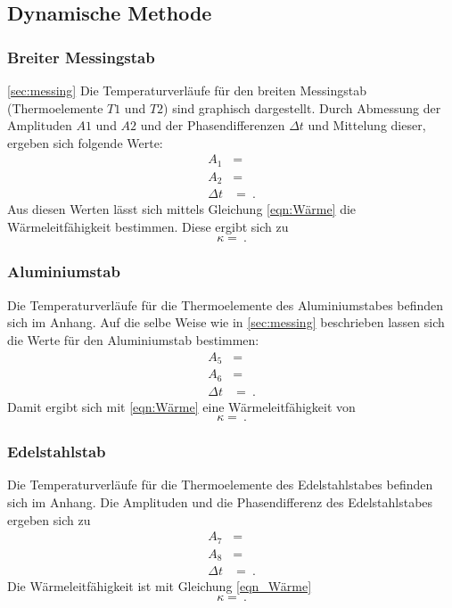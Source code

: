 \subsection{Dynamische Methode}
\subsubsection{Breiter Messingstab}
\ref{sec:messing}
Die Temperaturverläufe für den breiten Messingstab (Thermoelemente $T1$ und $T2$)
sind graphisch dargestellt. %
\newline
Durch Abmessung der Amplituden $A1$ und $A2$ und der Phasendifferenzen $\Delta t$ 
und Mittelung dieser, ergeben sich folgende Werte:
\begin{align*}
    A_{1} &= \SI{}{} \\
    A_{2} &= \SI{}{} \\
    \Delta t &= \SI{}{}.
\end{align*}
Aus diesen Werten lässt sich mittels Gleichung \eqref{eqn:Wärme} die Wärmeleitfähigkeit
bestimmen. Diese ergibt sich zu
\begin{equation*}
    \kappa = \SI{}{}.
\end{equation*}

\subsubsection{Aluminiumstab}
Die Temperaturverläufe für die Thermoelemente des Aluminiumstabes befinden sich im Anhang. %
Auf die selbe Weise wie in \ref{sec:messing} beschrieben lassen sich die Werte
für den Aluminiumstab bestimmen:
\begin{align*}
    A_{5} &= \SI{}{} \\
    A_{6} &= \SI{}{} \\
    \Delta t &= \SI{}{}.
\end{align*}
Damit ergibt sich mit \eqref{eqn:Wärme} eine Wärmeleitfähigkeit von
\begin{equation*}
    \kappa = \SI{}{}.
\end{equation*}

\subsubsection{Edelstahlstab}
Die Temperaturverläufe für die Thermoelemente des Edelstahlstabes befinden sich im Anhang. %
Die Amplituden und die Phasendifferenz des Edelstahlstabes ergeben sich zu
\begin{align*}
    A_{7} &= \SI{}{} \\
    A_{8} &= \SI{}{} \\
    \Delta t &= \SI{}{}.
\end{align*}
Die Wärmeleitfähigkeit ist mit Gleichung \eqref{eqn_Wärme}
\begin{equation*}
    \kappa = \SI{}{}.
\end{equation*}